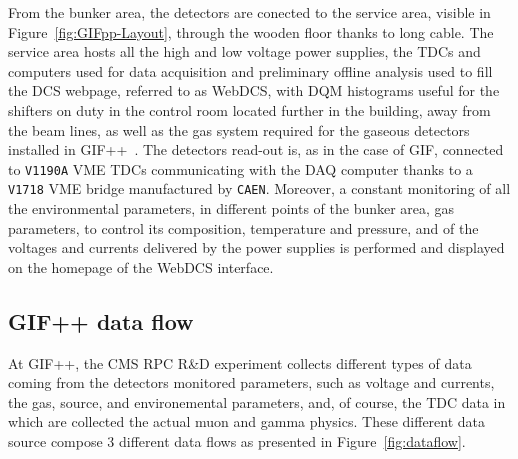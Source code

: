 	From the bunker area, the detectors are conected to the service area, visible in Figure~\ref{fig:GIFpp-Layout}, through the wooden floor thanks to long cable. The service area hosts all the high and low voltage power supplies, the TDCs and computers used for data acquisition and preliminary offline analysis used to fill the \acf{DCS} webpage, referred to as WebDCS, with \acf{DQM} histograms useful for the shifters on duty in the control room located further in the building, away from the beam lines, as well as the gas system required for the gaseous detectors installed in GIF++~\cite{WEBDCS}. The detectors read-out is, as in the case of GIF, connected to \texttt{V1190A} VME TDCs communicating with the DAQ computer thanks to a \texttt{V1718} VME bridge manufactured by \texttt{CAEN}. Moreover, a constant monitoring of all the environmental parameters, in different points of the bunker area, gas parameters, to control its composition, temperature and pressure, and of the voltages and currents delivered by the power supplies is performed and displayed on the homepage of the WebDCS interface.

	\subsection{GIF++ data flow}
	\label{chapt5:ssec:dataflow}
	
	At GIF++, the CMS RPC R\&D experiment collects different types of data coming from the detectors monitored parameters, such as voltage and currents, the gas, source, and environemental parameters, and, of course, the TDC data in which are collected the actual muon and gamma physics. These different data source compose 3 different data flows as presented in Figure~\ref{fig:dataflow}.
	
